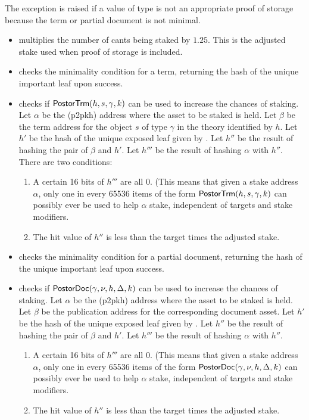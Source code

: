 The exception {} is raised if a value of type {}
is not an appropriate proof of storage
because the term or partial document is not minimal.
\begin{itemize}
\item {} multiplies the number of cants being staked by $1.25$.
This is the adjusted stake used when proof of storage is included.
\item {} checks the minimality condition for a term,
returning the hash of the unique important leaf upon success.
\item {} checks if
${\constr{PostorTrm}}(h,s,\gamma,k)$
can be used to increase the chances of staking.
Let $\alpha$ be the (p2pkh) address where the asset to be staked is held.
Let $\beta$ be the term address for the object $s$ of type $\gamma$ in the theory identified by $h$.
Let $h'$ be the hash of the unique exposed leaf given by {}.
Let $h''$ be the result of hashing the pair of $\beta$ and $h'$.
Let $h'''$ be the result of hashing $\alpha$ with $h''$.
There are two conditions:
\begin{enumerate}
\item A certain 16 bits of $h'''$ are all $0$. (This means that given a stake address $\alpha$,
only one in every 65536 items of the form
${\constr{PostorTrm}}(h,s,\gamma,k)$
can possibly ever be used to help $\alpha$ stake, independent of targets and stake modifiers.
\item The hit value of $h''$ is less than the target times the adjusted stake.
\end{enumerate}
\item {} checks the minimality condition for a partial document,
returning the hash of the unique important leaf upon success.
\item {} checks if
${\constr{PostorDoc}}(\gamma,\nu,h,\Delta,k)$
can be used to increase the chances of staking.
Let $\alpha$ be the (p2pkh) address where the asset to be staked is held.
Let $\beta$ be the publication address for the corresponding document asset.
Let $h'$ be the hash of the unique exposed leaf given by {}.
Let $h''$ be the result of hashing the pair of $\beta$ and $h'$.
Let $h'''$ be the result of hashing $\alpha$ with $h''$.
\begin{enumerate}
\item A certain 16 bits of $h'''$ are all $0$. (This means that given a stake address $\alpha$,
only one in every 65536 items of the form
${\constr{PostorDoc}}(\gamma,\nu,h,\Delta,k)$
can possibly ever be used to help $\alpha$ stake, independent of targets and stake modifiers.
\item The hit value of $h''$ is less than the target times the adjusted stake.
\end{enumerate}
\end{itemize}


